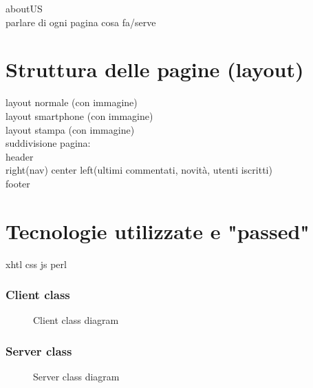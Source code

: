 aboutUS\\

parlare di ogni pagina cosa fa/serve\\


\section{Struttura delle pagine (layout)}
layout normale (con immagine)\\
layout smartphone (con immagine)\\
layout stampa (con immagine)\\


suddivisione pagina:\\
header\\
right(nav) center left(ultimi commentati, novità, utenti iscritti)\\
footer\\



\section{Tecnologie utilizzate e "passed"}

xhtl css js perl




\subsubsection{Client class }
\begin{center}
\begin{figure}[H]
\centering
\caption{Client class diagram}
\label{ww-lists }
\end{figure}
\end{center}



\subsubsection{Server class }
\begin{center}
\begin{figure}[H]
\centering
\caption{Server class diagram}
\label{ww-lists }
\end{figure}
\end{center}





